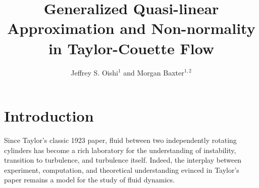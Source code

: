 \documentclass[openacc]{rstransa}%
\begin{document}
\title{Generalized Quasi-linear Approximation and Non-normality in Taylor-Couette Flow}

\author{%
Jeffrey S. Oishi$^{1}$ and Morgan Baxter$^{1,2}$}

\address{$^{1}$Department of Physics and Astronomy, Bates College, Lewiston, ME USA\\
$^{2}$Company Name, Whereever, USA}

\subject{xxxxx, xxxxx, xxxx}



\begin{abstract}

\end{abstract}


\begin{fmtext}
\end{fmtext}

\maketitle

\section{Introduction}
\label{sec:intro}
Since Taylor's classic 1923 paper\cite{1923RSPTA.223..289T}, fluid between two independently rotating cylinders has become a rich laboratory for the understanding of instability, transition to turbulence, and turbulence itself. Indeed, the interplay between experiment, computation, and theoretical understanding evinced in Taylor's paper remains a model for the study of fluid dynamics.
\end{document}
